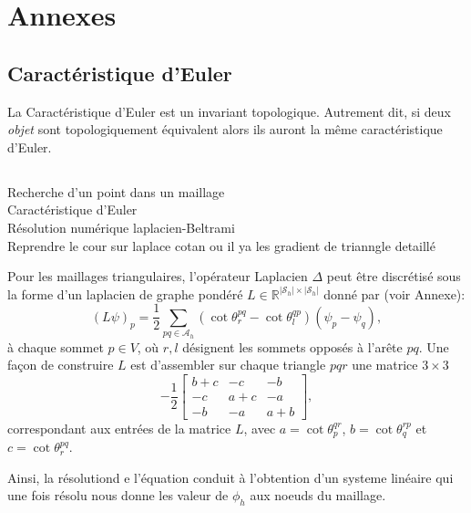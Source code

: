 \chapter*{Annexes}
\label{chap:annexes}

\section{Caractéristique d'Euler}

La Caractéristique d'Euler est un invariant topologique. Autrement dit, si deux \emph{objet} sont topologiquement équivalent alors ils auront la même caractéristique d'Euler.

\section{}

Recherche d'un point dans un maillage\\
Caractéristique d'Euler\\
Résolution numérique laplacien-Beltrami\\
Reprendre le cour sur laplace cotan ou il ya les gradient de trianngle detaillé
\[\]

Pour les maillages triangulaires, l'opérateur Laplacien $\Delta$ peut être discrétisé sous la forme d'un laplacien de graphe pondéré $L\in\mathbb{R}^{|\mathcal{S}_h|\times|\mathcal{S}_h|}$ donné par \cite{sharp2019vector} (voir Annexe):
$$
(L\psi)_p=\frac{1}{2}\sum_{pq\in\mathcal{A}_h}(\cot\theta_r^{pq}-\cot\theta_l^{qp})(\psi_p-\psi_q),
$$
à chaque sommet $p\in V$, où $r, l$ désignent les sommets opposés à l'arête $pq$. Une façon de construire $L$ est d'assembler sur chaque triangle $pqr$ une matrice $3\times 3$
$$
-\frac{1}{2}
\begin{bmatrix}
b+c & -c & -b\\
-c & a+c & -a\\
-b & -a & a+b
\end{bmatrix},
$$
correspondant aux entrées de la matrice $L$, avec $a=\cot\theta_p^{qr}$, $b=\cot\theta_q^{rp}$ et $c=\cot\theta_r^{pq}$.

Ainsi, la résolutiond e l'équation conduit à l'obtention d'un systeme linéaire qui une fois résolu nous donne les valeur de $\phi_h$ aux noeuds du maillage.
